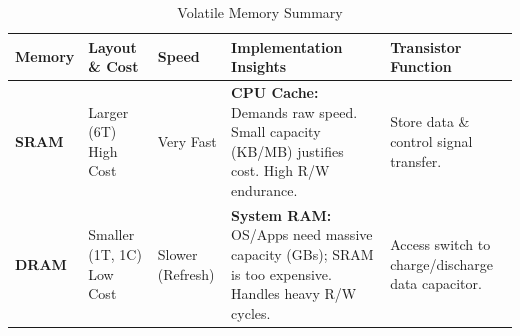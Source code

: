 \documentclass[10pt]{article}
\begin{document}
\small 

\raggedright

\tableofcontents

\newpage

\begin{table}[H]
    \centering
    \footnotesize %
    \renewcommand{\arraystretch}{1.2} %
    \begin{tabular}{@{} l p{2.2cm} l p{4.5cm} p{3.5cm} @{}}
        \toprule
        \textbf{Memory} & \textbf{Layout \& Cost} & \textbf{Speed} & \textbf{Implementation Insights} & \textbf{Transistor Function} \\
        \midrule
        \textbf{SRAM} & 
        Larger (6T) \newline High Cost & 
        Very Fast & 
        \textbf{CPU Cache:} Demands raw speed. Small capacity (KB/MB) justifies cost. High R/W endurance. & 
        Store data \& control signal transfer. \\
        
        \textbf{DRAM} & 
        Smaller (1T, 1C) \newline Low Cost & 
        Slower \newline (Refresh) & 
        \textbf{System RAM:} OS/Apps need massive capacity (GBs); SRAM is too expensive. Handles heavy R/W cycles. & 
        Access switch to charge/discharge data capacitor. \\
        \bottomrule
    \end{tabular}
    \caption{Volatile Memory Summary}
\end{table}
\end{document}
